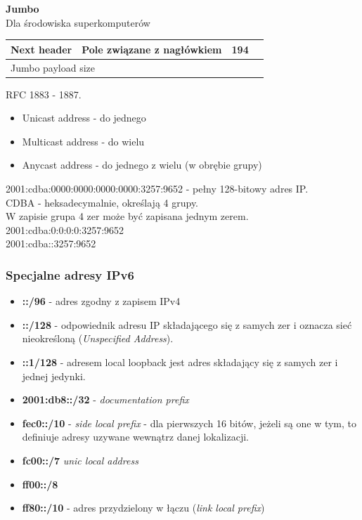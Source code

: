 \documentclass[a4paper,twoside]{article}
\begin{document}
\textbf{Jumbo}\\
Dla środowiska superkomputerów
\begin{table}[h]
	\begin{tabular}{|l|l|l|l|l|}
		\hline
		Next header & Pole związane z nagłówkiem & 194 & \multicolumn{2}{l|}{} \\ \hline
		\multicolumn{5}{|l|}{Jumbo payload size}                               \\ \hline
	\end{tabular}
\end{table}
RFC 1883 - 1887.

\begin{itemize}
	\item Unicast address - do jednego
	\item Multicast address - do wielu
	\item Anycast address - do jednego z wielu (w obrębie grupy)
\end{itemize}

2001:cdba:0000:0000:0000:0000:3257:9652 - pełny 128-bitowy adres IP.\\
CDBA - heksadecymalnie, określają 4 grupy.\\
W zapisie grupa 4 zer może być zapisana jednym zerem.\\
2001:cdba:0:0:0:0:3257:9652\\
2001:cdba::3257:9652

\subsubsection{Specjalne adresy IPv6}
\begin{itemize}
	\item \textbf{::/96} - adres zgodny z zapisem IPv4
	\item \textbf{::/128} - odpowiednik adresu IP składającego się z samych zer i oznacza sieć nieokreśloną (\emph{Unspecified Address}).
	\item \textbf{::1/128} - adresem local loopback jest adres składający się z samych zer i jednej jedynki.
	\item \textbf{2001:db8::/32} - \emph{documentation prefix}
	\item \textbf{fec0::/10} - \emph{side local prefix} - dla pierwszych 16 bitów, jeżeli są one w tym, to definiuje adresy uzywane wewnątrz danej lokalizacji.
	\item \textbf{fc00::/7} \emph{unic local address}
	\item \textbf{ff00::/8}
	\item \textbf{ff80::/10} - adres przydzielony w łączu (\emph{link local prefix})
\end{itemize}
\end{document}
